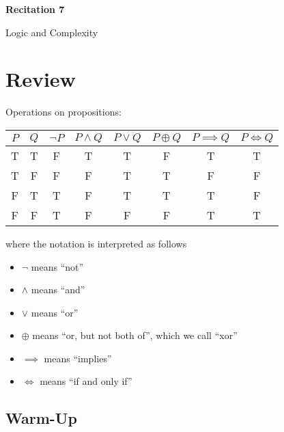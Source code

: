 \documentclass[12pt,letterpaper]{article}
\begin{document}
  \thispagestyle{firstpagestyle}
  \begin{center}
    {\large \textbf{Recitation 7}}
    
    {\large Logic and Complexity}

  \end{center}

	\section*{Review}

	Operations on propositions:

\begin{tabular}{c|c|c|c|c|c|c|c}
 $P$ & $Q$ & $\lnot P$ & $P \wedge Q$ & $P \vee Q$ & $P \oplus Q$ & $P \implies Q$ & $P \iff Q$\\
\hline
T & T & F & T & T & F & T & T\\
T & F & F & F & T & T & F & F\\
F & T & T & F & T & T & T & F\\
F & F & T & F & F & F & T & T
\end{tabular}

where the notation is interpreted as follows
\begin{itemize}
\item $\lnot$ means ``not''
\item $\wedge$ means ``and''
\item $\vee$ means ``or''
\item $\oplus$ means ``or, but not both of'', which we call ``xor''
\item $\implies$ means ``implies''
\item $\iff$ means ``if and only if''
\end{itemize}

	\subsection*{Warm-Up}
\end{document}
